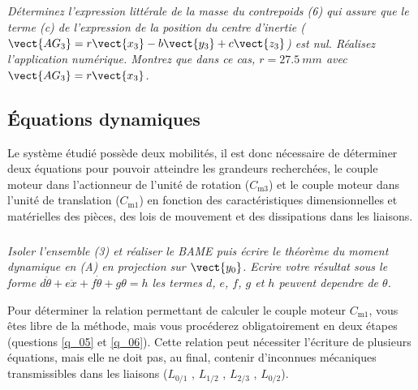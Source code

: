 \subparagraph{\label{q_03}}\textit{Déterminez l’expression littérale de la masse du contrepoids (6) qui assure que le terme (c) de l’expression de la position du centre d’inertie ($\vect{AG_3}=r\vect{x_3} - b\vect{y_3} + c\vect{z_3}$) est nul. Réalisez l’application numérique. Montrez que dans ce cas, $r=\SI{27,5}{mm}$ avec $\vect{AG_3}=r\vect{x_3}$.}

\subsection{Équations dynamiques}

Le système étudié possède deux mobilités, il est donc nécessaire de déterminer deux équations pour
pouvoir atteindre les grandeurs recherchées, le couple moteur dans l’actionneur de l’unité de rotation
($C_{\text{m3}}$) et le couple moteur dans l’unité de translation ($C_{\text{m1}}$) en fonction des caractéristiques
dimensionnelles et matérielles des pièces, des lois de mouvement et des dissipations dans les liaisons.


\subparagraph{\label{q_04}}\textit{Isoler l’ensemble (3) et réaliser le BAME puis écrire le théorème du moment dynamique en (A) en projection sur $\vect{y_0}$. Ecrire votre résultat sous le forme $d\ddot{\theta}+e\ddot{x}+f\dot{\theta}+g\theta = h $ les termes $d$, $e$, $f$, $g$ et $h$ peuvent dependre de $\theta$.}

 

Pour déterminer la relation permettant de calculer le couple moteur $C_{\text{m1}}$, vous êtes libre de la méthode,
mais vous procéderez obligatoirement en deux étapes (questions \ref{q_05} et \ref{q_06}). Cette relation peut nécessiter
l’écriture de plusieurs équations, mais elle ne doit pas, au final, contenir d’inconnues mécaniques
transmissibles dans les liaisons ($L_{\text{0/1}}$ , $L_{\text{1/2}}$ , $L_{\text{2/3}}$ , $L_{\text{0/2}}$).

